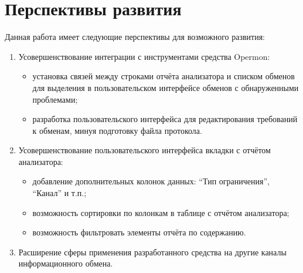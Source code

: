 \section{Перспективы развития} 

Данная работа имеет следующие перспективы для возможного развития:

\begin{enumerate}
 \item Усовершенствование интеграции с  инструментами средства Opermon:
 \begin{itemize}
  \item установка связей между строками отчёта анализатора и списком обменов 
для выделения в пользовательском интерфейсе обменов с обнаруженными проблемами;
  \item разработка пользовательского интерфейса для редактирования требований к 
обменам, минуя подготовку файла протокола.
 \end{itemize}
 
 \item Усовершенствование пользовательского интерфейса вкладки с отчётом 
анализатора:
 \begin{itemize}
  \item добавление дополнительных колонок данных: ``Тип ограничения'', 
``Канал'' и т.п.;
  \item возможность сортировки по колонкам в таблице с отчётом анализатора;
  \item возможность фильтровать элементы отчёта по содержанию.
 \end{itemize}

 \item Расширение сферы применения разработанного средства на другие каналы 
информационного обмена.
\end{enumerate}

